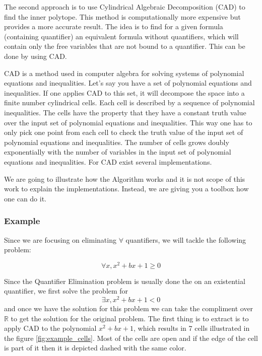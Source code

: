The second approach is to use Cylindrical Algebraic Decomposition (CAD) to find the inner polytope.
This method is computationally more expensive but provides a more accurate result.
The idea is to find for a given formula (containing quantifier) an equivalent formula without quantifiers, which will contain only the free variables
that are not bound to a quantifier.
This can be done by using CAD.

CAD is a method used in computer algebra for solving systems of polynomial equations and inequalities.
Let's say you have a set of polynomial equations and inequalities.
If one applies CAD to this set, it will decompose the space into a finite number cylindrical cells.
Each cell is described by a sequence of polynomial inequalities.
The cells have the property that they have a constant truth value over the input set of polynomial equations and inequalities.
This way one has to only pick one point from each cell to check the truth value of the input set of polynomial equations and inequalities.
The number of cells grows doubly exponentially with the number of variables in the input set of polynomial equations and inequalities.
For CAD exist several implementations.

We are going to illustrate how the Algorithm works and it is not scope of this work to explain the implementations.
Instead, we are giving you a toolbox how one can do it.

\subsubsection{Example}
Since we are focusing on eliminating $\forall$ quantifiers, we will tackle the following problem:

\[ \forall x, x^2 + bx + 1 \geq
	0 \]

Since the Quantifier Elimination problem is usually done the on an existential quantifier, we first solve the problem for \[
	\exists x, x^2 + bx + 1 < 0 \] and once we have the solution for this problem we can take the compliment over $\mathbb{R}$ to get the solution for
the original problem.
The first thing is to extract is to apply CAD to the polynomial $x^2 + bx + 1$, which results in 7 cells illustrated in the figure
\ref{fig:example_cells}.
Most of the cells are open and if the edge of the cell is part of it then it is depicted dashed with the same color.

